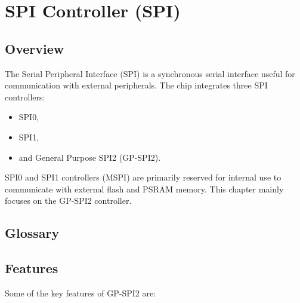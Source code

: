 \documentclass[main\_\_EN.tex]{subfiles}
\begin{document}

\ifglobal
\else
    {\let\clearpage\relax \listoftodos}
    \tableofcontents
\fi


\hypertarget{spi}{}
\chapter{SPI Controller (SPI)}
\label{mod:spi}

\section{Overview}

The Serial Peripheral Interface (SPI) is a synchronous serial interface useful for communication with external peripherals.
The \chipname{} chip integrates three SPI controllers:
\begin{itemize}
  \item SPI0,
  \item SPI1,
  \item and General Purpose SPI2 (GP-SPI2).
\end{itemize}

SPI0 and SPI1 controllers (MSPI) are primarily reserved for internal use to communicate with external flash and PSRAM memory. This chapter mainly focuses on the GP-SPI2 controller.

\section{Glossary}


\section{Features}

Some of the key features of GP-SPI2 are:
\end{document}
